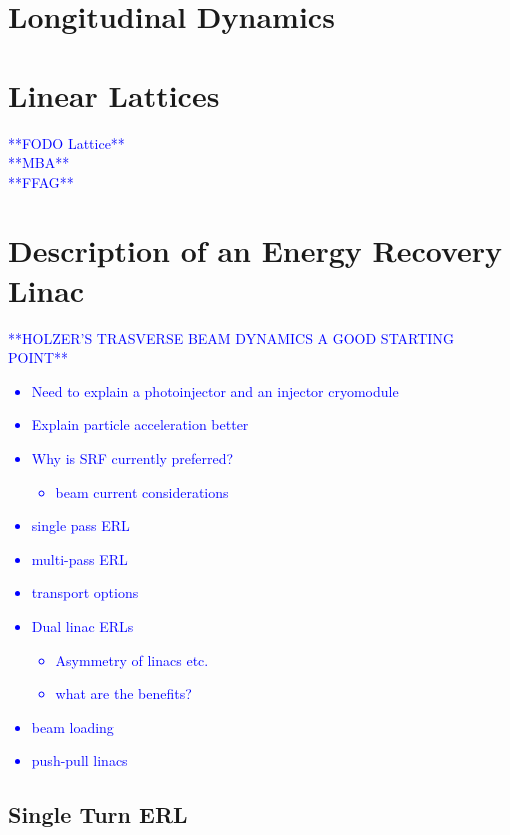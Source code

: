 \documentclass[../main.tex]{subfiles}
\begin{document}
\section{Longitudinal Dynamics}

\section{Linear Lattices}
\textcolor{blue}{**FODO Lattice** \\ **MBA** \\ **FFAG**}

\section{Description of an Energy Recovery Linac}

\textcolor{blue}{**HOLZER'S TRASVERSE BEAM DYNAMICS A GOOD STARTING POINT**}

\textcolor{blue}{\begin{itemize}
    \item{Need to explain a photoinjector and an injector cryomodule}
    \item{Explain particle acceleration better}
    \item{Why is SRF currently preferred?
        \begin{itemize}
            \item{beam current considerations} 
        \end{itemize}}
    \item{single pass ERL}
    \item{multi-pass ERL}
    \item{transport options}
    \item{Dual linac ERLs
        \begin{itemize}
            \item{Asymmetry of linacs etc.}
            \item{what are the benefits?}
        \end{itemize}}
    \item{beam loading}
    \item{push-pull linacs}
\end{itemize}}

\subsection{Single Turn ERL}
\end{document}
